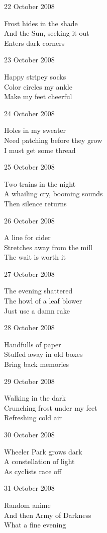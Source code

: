 \documentclass[12pt]{article}
\begin{document}
22 October 2008

Frost hides in the shade \\
And the Sun, seeking it out \\
Enters dark corners

23 October 2008

Happy stripey socks \\
Color circles my ankle \\
Make my feet cheerful

24 October 2008

Holes in my sweater \\
Need patching before they grow \\
I must get some thread

\newpage


25 October 2008

Two trains in the night \\
A whailing cry, booming sounds \\
Then silence returns

26 October 2008

A line for cider \\
Stretches away from the mill \\
The wait is worth it

27 October 2008

The evening shattered \\
The howl of a leaf blower \\
Just use a damn rake

28 October 2008

Handfulls of paper \\
Stuffed away in old boxes \\
Bring back memories

29 October 2008

Walking in the dark \\
Crunching frost under my feet \\
Refreshing cold air

30 October 2008

Wheeler Park grows dark \\
A constellation of light \\
As cyclists race off

31 October 2008

Random anime \\
And then Army of Darkness \\
What a fine evening


\newpage
\end{document}
